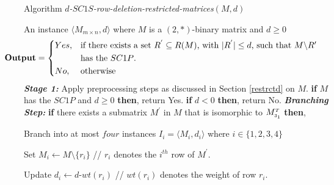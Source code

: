 \documentclass[review, 1p]{elsarticle}
\begin{document}
\begin{algorithm}[h]
\caption{Algorithm  \textit{$d$-$SC1S$-row-deletion-restricted-matrices}$(M,d)$\label{alg1}}
\begin{algorithmic}[1]
 \Require An instance $\langle M_{m \times n},d \rangle$ where $M$ is a $(2,*)$-binary matrix and $d \geq 0$ \vspace{-0.1 in} \[ \hspace{-0.48 in}\textbf{Output} = \begin{dcases*} Yes,  & if there exists a set  $R^{'} \subseteq R(M)$, with $\vert R^{'} \vert \leq d$, such that $M \backslash R'$ \\  
        & has the $SC1P$.  
   \\  
   No,    & otherwise
\end{dcases*}
\] \vspace{-0.05 in} 
 \noindent \textit{\textbf{Stage 1:}}\vspace{-0.05 in} 
 \State Apply preprocessing steps as discussed in Section \ref{restrctd} on $M$. \vspace{-0.05 in} 
  \State \textbf{if}  {$M$ has the $SC1P$ and $d \geq 0$} \textbf{then},
 return Yes.\vspace{-0.05 in} 
\State \textbf{if} {$d < 0$} \textbf{then}, return No. \vspace{-0.05 in}  \newline \vspace{-0.05 in} 
\noindent \textit{\textbf{Branching Step:}} \State \textbf{if} {there exists a submatrix $M^{'}$ in $M$ that is isomorphic to ${M^{\mathsmaller T}_{\mathsmaller 3_{1}}}$} \textbf{then}, 

 \vspace{-0.05 in}
  Branch into at most $four$  instances $I_{i}=\langle M_{i}, d_{i}\rangle$ where $i \in \{1,2,3,4\}$ \vspace{-0.05 in} 
 
 Set $M_{i} \leftarrow M\setminus \{r_{i}\}$ \hspace{1.5 in}// $r_{i}$ denotes the $i^{th}$ row of $M^{'}$.   \vspace{-0.05 in} 
 
 
 Update $d_{i} \leftarrow d$-$wt(r_{i})$  \hspace{0.90 in}// $wt(r_{i})$ denotes the weight of row $r_{i}$. \vspace{-0.05 in} 
 

\end{algorithmic}
\end{algorithm}
\end{document}
